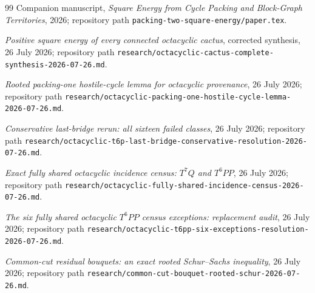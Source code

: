 \documentclass[11pt]{article}
\begin{document}
\begin{thebibliography}{99}
Companion manuscript, \emph{Square Energy from Cycle Packing and Block-Graph
Territories}, 2026; repository path
\texttt{packing-two-square-energy/paper.tex}.

\emph{Positive square energy of every connected octacyclic cactus}, corrected
synthesis, 26 July 2026; repository path
\texttt{research/octacyclic-cactus-complete-synthesis-2026-07-26.md}.

\emph{Rooted packing-one hostile-cycle lemma for octacyclic provenance},
26 July 2026; repository path
\texttt{research/octacyclic-packing-one-hostile-cycle-lemma-2026-07-26.md}.

\emph{Conservative last-bridge rerun: all sixteen failed classes},
26 July 2026; repository path
\texttt{research/octacyclic-t6p-last-bridge-conservative-resolution-2026-07-26.md}.

\emph{Exact fully shared octacyclic incidence census: $T^7Q$ and $T^6PP$},
26 July 2026; repository path
\texttt{research/octacyclic-fully-shared-incidence-census-2026-07-26.md}.

\emph{The six fully shared octacyclic $T^6PP$ census exceptions: replacement
audit}, 26 July 2026; repository path
\texttt{research/octacyclic-t6pp-six-exceptions-resolution-2026-07-26.md}.

\emph{Common-cut residual bouquets: an exact rooted Schur--Sachs inequality},
26 July 2026; repository path
\texttt{research/common-cut-bouquet-rooted-schur-2026-07-26.md}.
\end{thebibliography}
\end{document}
